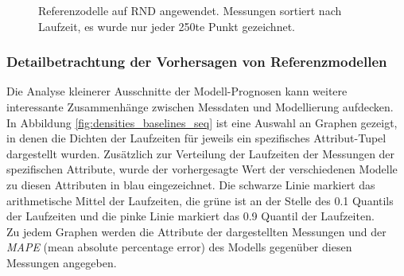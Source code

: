 \documentclass[
	12pt,
	a4paper,
	BCOR10mm,
	DIV14,
	listof=totoc,
	bibliography=totoc,
	headsepline
]{scrreprt}
\begin{document}
\begin{figure}
	\centering
	\hfill
	\caption{Referenzodelle auf RND angewendet. Messungen sortiert nach Laufzeit, es wurde nur jeder 250te Punkt gezeichnet.}
	\label{fig:zeit_baselines_sorted_rnd}
\end{figure} 
\clearpage
\subsubsection{Detailbetrachtung der Vorhersagen von Referenzmodellen}
Die Analyse kleinerer Ausschnitte der Modell-Prognosen kann weitere interessante Zusammenhänge zwischen Messdaten und Modellierung aufdecken.\\
In Abbildung \ref{fig:densities_baselines_seq} ist eine Auswahl an Graphen gezeigt, in denen die Dichten der Laufzeiten für jeweils ein spezifisches Attribut-Tupel dargestellt wurden.
Zusätzlich zur Verteilung der Laufzeiten der Messungen der spezifischen Attribute, wurde der vorhergesagte Wert der verschiedenen Modelle zu diesen Attributen in blau eingezeichnet.
Die schwarze Linie markiert das arithmetische Mittel der Laufzeiten, die grüne ist an der Stelle des 0.1 Quantils der Laufzeiten und die pinke Linie markiert das 0.9 Quantil der Laufzeiten.\\
Zu jedem Graphen werden die Attribute der dargestellten Messungen und der \textit{MAPE} (mean absolute percentage error) des Modells gegenüber diesen Messungen angegeben.\medskip
\end{document}
